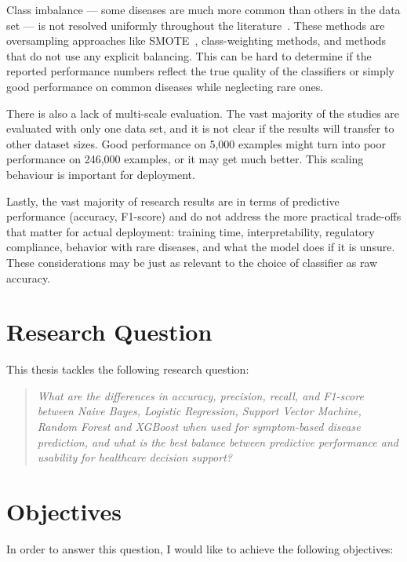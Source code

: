 Class imbalance --- some diseases are much more common than others in the data set --- is not resolved uniformly throughout the literature~\citep{Haixiang2017,Thabtah2020}. These methods are oversampling approaches like SMOTE~\citep{Chawla2002}, class-weighting methods, and methods that do not use any explicit balancing. This can be hard to determine if the reported performance numbers reflect the true quality of the classifiers or simply good performance on common diseases while neglecting rare ones.

There is also a lack of multi-scale evaluation. The vast majority of the studies are evaluated with only one data set, and it is not clear if the results will transfer to other dataset sizes. Good performance on 5,000 examples might turn into poor performance on 246,000 examples, or it may get much better. This scaling behaviour is important for deployment.

Lastly, the vast majority of research results are in terms of predictive performance (accuracy, F1-score) and do not address the more practical trade-offs that matter for actual deployment: training time, interpretability, regulatory compliance, behavior with rare diseases, and what the model does if it is unsure. These considerations may be just as relevant to the choice of classifier as raw accuracy.

\section{Research Question}
\label{sec:research_question}

This thesis tackles the following research question:

\begin{quote}
\textit{What are the differences in accuracy, precision, recall, and F1-score between Naive Bayes, Logistic Regression, Support Vector Machine, Random Forest and XGBoost when used for symptom-based disease prediction, and what is the best balance between predictive performance and usability for healthcare decision support?}
\end{quote}

\section{Objectives}
\label{sec:objectives}

In order to answer this question, I would like to achieve the following objectives:

